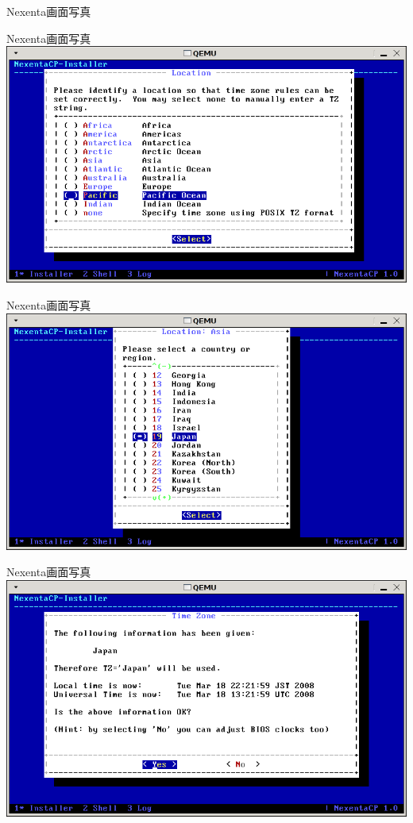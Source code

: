 \documentclass[cjk,dvipdfmx,12pt]{beamer}
\begin{document}
\begin{frame}{Nexenta画面写真}
\end{frame}\begin{frame}{Nexenta画面写真} 
\includegraphics[width=1.0\hsize]{image200804/nexenta4.png}
\end{frame}\begin{frame}{Nexenta画面写真} 
\includegraphics[width=1.0\hsize]{image200804/nexenta5.png}
\end{frame}\begin{frame}{Nexenta画面写真} 
\includegraphics[width=1.0\hsize]{image200804/nexenta6.png}

\end{frame}
\end{document}
